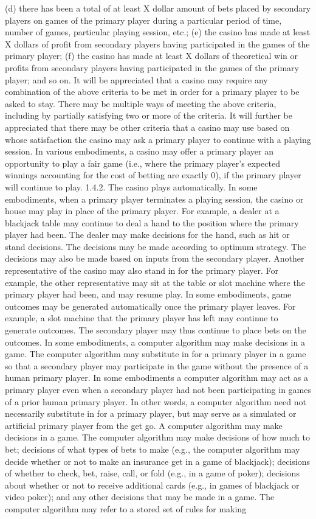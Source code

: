 \documentclass[11pt,a4paper]{article}
\begin{document}
(d) there has been a total of at least X dollar amount of bets placed by secondary players on games of the primary player during a particular period of time, number of games, particular playing session, etc.; (e) the casino has made at least X dollars of profit from secondary players having participated in the games of the primary player; (f) the casino has made at least X dollars of theoretical win or profits from secondary players having participated in the games of the primary player; and so on. It will be appreciated that a casino may require any combination of the above criteria to be met in order for a primary player to be asked to stay. There may be multiple ways of meeting the above criteria, including by partially satisfying two or more of the criteria. It will further be appreciated that there may be other criteria that a casino may use based on whose satisfaction the casino may ask a primary player to continue with a playing session. In various embodiments, a casino may offer a primary player an opportunity to play a fair game (i.e., where the primary player's expected winnings accounting for the cost of betting are exactly 0), if the primary player will continue to play. 1.4.2. The casino plays automatically. In some embodiments, when a primary player terminates a playing session, the casino or house may play in place of the primary player. For example, a dealer at a blackjack table may continue to deal a hand to the position where the primary player had been. The dealer may make decisions for the hand, such as hit or stand decisions. The decisions may be made according to optimum strategy. The decisions may also be made based on inputs from the secondary player. Another representative of the casino may also stand in for the primary player. For example, the other representative may sit at the table or slot machine where the primary player had been, and may resume play. In some embodiments, game outcomes may be generated automatically once the primary player leaves. For example, a slot machine that the primary player has left may continue to generate outcomes. The secondary player may thus continue to place bets on the outcomes. In some embodiments, a computer algorithm may make decisions in a game. The computer algorithm may substitute in for a primary player in a game so that a secondary player may participate in the game without the presence of a human primary player. In some embodiments a computer algorithm may act as a primary player even when a secondary player had not been participating in games of a prior human primary player. In other words, a computer algorithm need not necessarily substitute in for a primary player, but may serve as a simulated or artificial primary player from the get go. A computer algorithm may make decisions in a game. The computer algorithm may make decisions of how much to bet; decisions of what types of bets to make (e.g., the computer algorithm may decide whether or not to make an insurance get in a game of blackjack); decisions of whether to check, bet, raise, call, or fold (e.g., in a game of poker); decisions about whether or not to receive additional cards (e.g., in games of blackjack or video poker); and any other decisions that may be made in a game. The computer algorithm may refer to a stored set of rules for making 
\end{document}

